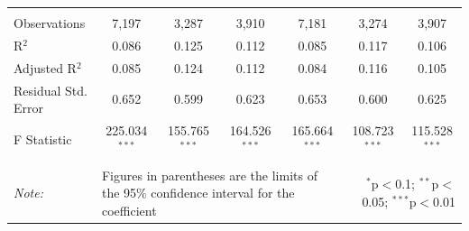\documentclass[alpha-refs]{wiley-article-01g}
\begin{document}
\begin{landscape}
\begin{table}[!htbp]
\begin{tabular}{@{\extracolsep{5pt}}lcccccc}
  & & & & & & \\ 
\hline \\[-3ex] 
Observations & 7,197 & 3,287 & 3,910 & 7,181 & 3,274 & 3,907 \\ 
R$^{2}$ & 0.086 & 0.125 & 0.112 & 0.085 & 0.117 & 0.106 \\ 
Adjusted R$^{2}$ & 0.085 & 0.124 & 0.112 & 0.084 & 0.116 & 0.105 \\ 
Residual Std. Error & 0.652 & 0.599 & 0.623 & 0.653 & 0.600 & 0.625 \\ 
F Statistic & 225.034$^{***}$ & 155.765$^{***}$ & 164.526$^{***}$ & 165.664$^{***}$ & 108.723$^{***}$ & 115.528$^{***}$ \\ 
\hline 
\hline \\[-3ex] 
\textit{Note:} &\multicolumn{4}{l}{Figures in parentheses are the limits of the 95\% confidence interval for the coefficient}  & \multicolumn{2}{r}{$^{*}$p$<$0.1; $^{**}$p$<$0.05; $^{***}$p$<$0.01} \\ 
\end{tabular} 
\end{table} 

\end{landscape}

\newpage
\end{document}

